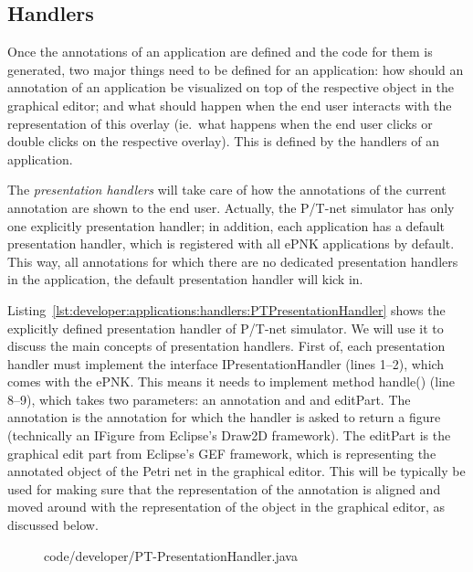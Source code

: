 
\subsection{Handlers}
\label{subsec:developer:applications:handlers}

Once the annotations of an application are defined and the code
for them is generated, two major things need to be defined for an application:
how should an annotation of an application be visualized on top of
the respective object in the graphical editor; and what should happen
when the end user interacts with the representation of this overlay (ie.\,
what happens when the end user clicks or double clicks on the respective overlay). This
is defined by the handlers of an application.

The \emph{presentation handlers} will take care of how the annotations of
the current annotation are shown to the end user. Actually, the
P/T-net simulator has only one explicitly presentation handler; in addition,
each application has a default presentation handler, which is registered with
all ePNK applications by default. This way, all annotations for which there
are no dedicated presentation handlers in the application, the default
presentation handler will kick in.

Listing~\ref{lst:developer:applications:handlers:PTPresentationHandler} shows the
explicitly defined presentation handler of P/T-net simulator. We will use it
to discuss the main concepts of presentation handlers. First of, each
presentation handler must implement the interface {\sf IPresentationHandler} (lines 1--2),
which comes with the ePNK. This means it needs to implement method {\sf handle()} (line 8--9),
which takes two parameters: an {\sf annotation} and and {\sf editPart}. The annotation is
the {\sf annotation} for which the handler is asked to return a figure (technically an {\sf IFigure}
from Eclipse's Draw2D framework). The {\sf editPart} is the graphical edit part from Eclipse's
GEF framework, which is representing the annotated object of the Petri net in the graphical
editor. This will be typically be used for making sure that the representation of the
annotation is aligned and moved around with the representation of the object in the
graphical editor, as discussed below.

\begin{figure}[htbp!]
%
  {code/developer/PT-PresentationHandler.java}
\end{figure}


